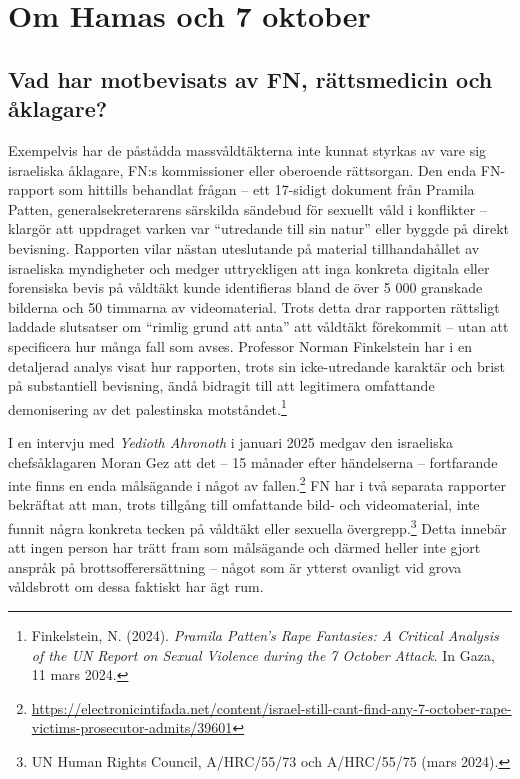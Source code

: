 \documentclass[12pt]{article}
\begin{document}
\section{Om Hamas och 7 oktober}


\subsection{Vad har motbevisats av FN, rättsmedicin och åklagare?}
Exempelvis har de påstådda massvåldtäkterna inte kunnat styrkas av vare sig israeliska åklagare, FN:s kommissioner eller oberoende rättsorgan. Den enda FN-rapport som hittills behandlat frågan – ett 17-sidigt dokument från Pramila Patten, generalsekreterarens särskilda sändebud för sexuellt våld i konflikter – klargör att uppdraget varken var \enquote{utredande till sin natur} eller byggde på direkt bevisning. Rapporten vilar nästan uteslutande på material tillhandahållet av israeliska myndigheter och medger uttryckligen att inga konkreta digitala eller forensiska bevis på våldtäkt kunde identifieras bland de över 5 000 granskade bilderna och 50 timmarna av videomaterial. Trots detta drar rapporten rättsligt laddade slutsatser om \enquote{rimlig grund att anta} att våldtäkt förekommit – utan att specificera hur många fall som avses. Professor Norman Finkelstein har i en detaljerad analys visat hur rapporten, trots sin icke-utredande karaktär och brist på substantiell bevisning, ändå bidragit till att legitimera omfattande demonisering av det palestinska motståndet.\footnote{Finkelstein, N. (2024). \textit{Pramila Patten’s Rape Fantasies: A Critical Analysis of the UN Report on Sexual Violence during the 7 October Attack}. In Gaza, 11 mars 2024.}

I en intervju med \textit{Yedioth Ahronoth} i januari 2025 medgav den israeliska chefsåklagaren Moran Gez att det – 15 månader efter händelserna – fortfarande inte finns en enda målsägande i något av fallen.\footnote{\url{https://electronicintifada.net/content/israel-still-cant-find-any-7-october-rape-victims-prosecutor-admits/39601}} FN har i två separata rapporter bekräftat att man, trots tillgång till omfattande bild- och videomaterial, inte funnit några konkreta tecken på våldtäkt eller sexuella övergrepp.\footnote{UN Human Rights Council, A/HRC/55/73 och A/HRC/55/75 (mars 2024).}
Detta innebär att ingen person har trätt fram som målsägande och därmed heller inte gjort anspråk på brottsofferersättning – något som är ytterst ovanligt vid grova våldsbrott om dessa faktiskt har ägt rum.
\end{document}
